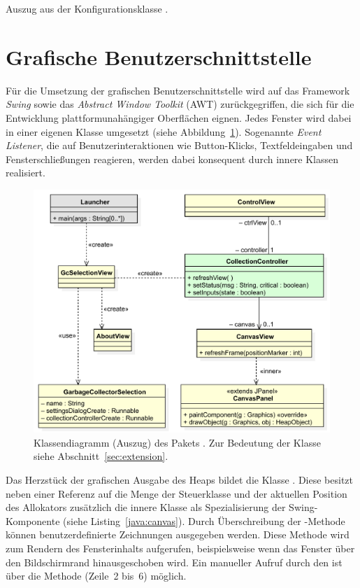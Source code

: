 \begin{listing}[h]
	\inputminted[]{java}{code/Settings.java}
	\caption[Auszug aus der Konfigurationsklasse ]{Auszug aus der Konfigurationsklasse .}
	\label{java:settings}
\end{listing}

\section{Grafische Benutzerschnittstelle}
\label{sec:gui}
Für die Umsetzung der grafischen Benutzerschnittstelle wird auf das Framework \textit{Swing} sowie das \textit{Abstract Window Toolkit} (AWT) zurückgegriffen, die sich für die Entwicklung plattformunahängiger Oberflächen eignen.
Jedes Fenster wird dabei in einer eigenen Klasse umgesetzt (siehe Abbildung~\ref{fig:gui}).
Sogenannte \textit{Event Listener}, die auf Benutzerinteraktionen wie Button-Klicks, Textfeldeingaben und Fensterschließungen reagieren, werden dabei konsequent durch innere Klassen
realisiert.

\begin{figure}[h]
	\centering
	\includegraphics[scale=0.6]{img/uml/ch7-gui.pdf}
	\caption[Klassendiagramm des Pakets ]{Klassendiagramm (Auszug) des Pakets . Zur Bedeutung der Klasse  siehe Abschnitt~\ref{sec:extension}.}
	\label{fig:gui}
\end{figure}

Das Herzstück der grafischen Ausgabe des Heaps bildet die Klasse .
Diese besitzt neben einer Referenz auf die Menge  der Steuerklasse und der aktuellen Position des Allokators zusätzlich die innere Klasse  als Spezialisierung der Swing-Komponente  (siehe Listing~\ref{java:canvas}).
Durch Überschreibung der -Methode können benutzerdefinierte Zeichnungen ausgegeben werden.
Diese Methode wird zum Rendern des Fensterinhalts aufgerufen, beispielsweise wenn das Fenster über den Bildschirmrand hinausgeschoben wird.
Ein manueller Aufruf durch den  ist über die Methode  (Zeile~2 bis~6) möglich.

